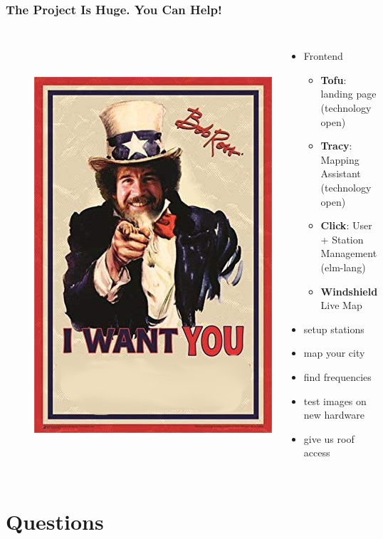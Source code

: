 \documentclass[aspectratio=169]{beamer}
\begin{document}
\begin{frame}
\frametitle{The Project Is Huge. You Can Help!}


\begin{figure}
\begin{columns}
\centering
  \includegraphics[height=0.75\textheight]{figs/bob_ross_wants_you.jpg}
\centering
\begin{itemize}
  \item Frontend
        \begin{itemize}
          \item \textbf{Tofu}: landing page (technology open)
          \item \textbf{Tracy}: Mapping Assistant (technology open)
          \item \textbf{Click}: User + Station Management (elm-lang)
          \item \textbf{Windshield} Live Map
        \end{itemize}
  \item setup stations
  \item map your city
  \item find frequencies
  \item test images on new hardware
  \item give us roof access
\end{itemize}
\end{columns}
\end{figure}


\end{frame}


\section{Questions}
\end{document}
